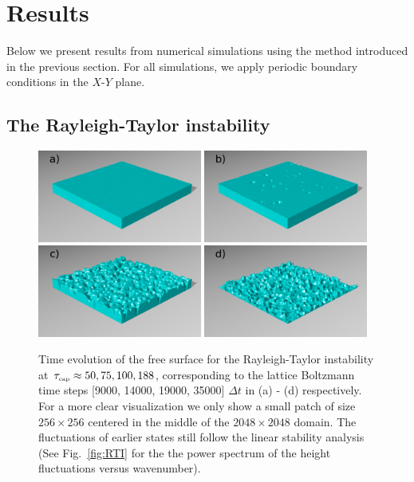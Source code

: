 \section{Results}\label{sec:results}
Below we present results from numerical simulations using the method introduced in the previous section. For all simulations, we apply periodic boundary conditions in the $X$-$Y$ plane.
\subsection{The Rayleigh-Taylor instability}

\begin{figure}
    \includegraphics[width=0.48\textwidth]{graphics/Fig_2_1_rti_renders_a).png}
    \includegraphics[width=0.48\textwidth]{graphics/Fig_2_2_rti_renders_b).png}
    \includegraphics[width=0.48\textwidth]{graphics/Fig_2_3_rti_renders_c).png}
    \includegraphics[width=0.48\textwidth]{graphics/Fig_2_4_rti_renders_d).png}
  \caption{Time evolution of the free surface for the Rayleigh-Taylor instability at $\tau_{\mbox{\tiny{cap}}}\approx50, 75, 100, 188$, corresponding to the lattice Boltzmann time steps [9000, 14000, 19000, 35000] $\Delta t$ in (a) - (d) respectively. For a more clear visualization we only show a small patch of size $256\times256$ centered in the middle of the $2048\times 2048$ domain. The fluctuations of earlier states still follow the linear stability analysis (See Fig.~\ref{fig:RTI} for the the power
spectrum  of the  height fluctuations versus wavenumber).}
  \label{fig:RTI_evolution}
\end{figure}


